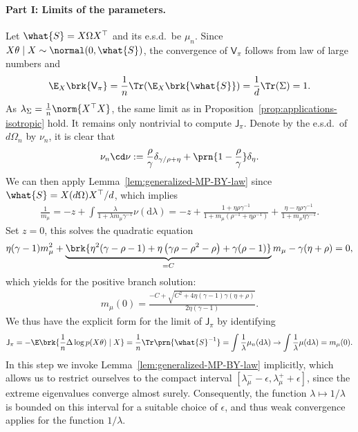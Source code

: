\documentclass[11pt]{article}
\newcommand{\de}{\mathrm{d}}
\newcommand{\jfunc}{\mathsf{J}}
\begin{document}
\paragraph{Part I: Limits of the parameters.} Let $\what{S}=X \Omega X^\top$ and its e.s.d.\ be $\mu_n$. Since $X\theta\mid X \sim \normal(0, \what{S})$, the convergence of $\mathsf{V}_{\pi}$ follows from law of large numbers and
\begin{align*}
    \E_X \brk{\mathsf{V}_{\pi}} = \frac{1}{n} \Tr(\E_{X}\brk{\what{S}}) = \frac{1}{d} \Tr(\Sigma) = 1.
\end{align*}
As $\lambda_\Sigma = \frac{1}{n} \norm{X^\top X}$, the same limit as in Proposition~\ref{prop:applications-isotropic} hold. It remains only nontrivial to compute $\jfunc_{\pi}$. Denote by the e.s.d.\ of $d\Omega_n$ by $\nu_n$, it is clear that
\begin{align*}
    \nu_n \cd \nu := \frac{\rho}{\gamma} \delta_{\gamma/\rho + \eta} + \prn{1 - \frac{\rho}{\gamma}} \delta_{\eta}.
\end{align*}
We can then apply Lemma~\ref{lem:generalized-MP-BY-law} since $\what{S} = X(d\Omega) X^\top / d$, which implies
\begin{align*}
    \frac{1}{m_\mu} = -z + \int \frac{\lambda}{1 + \lambda m_\mu \gamma^{-1}} \nu(\de \lambda) = -z + \frac{1 + \eta \rho \gamma^{-1}}{1 +  m_\mu (\rho^{-1} + \eta \rho^{-1})} + \frac{\eta - \eta \rho \gamma^{-1}}{1 + m_\mu \eta \gamma^{-1}}.
\end{align*}
Set $z=0$, this solves the quadratic equation
\begin{align*}
    \eta(\gamma-1) m_\mu^2+\underbrace{\brk{\eta^2(\gamma-\rho-1)+\eta\left(\gamma \rho-\rho^2-\rho\right)+\gamma(\rho-1)}}_{=C} m_\mu-\gamma(\eta+\rho) = 0,
\end{align*}
which yields for the positive branch solution:
\begin{align*}
    m_\mu(0)=\frac{-C+\sqrt{C^2+4 \eta(\gamma-1) \gamma(\eta+\rho)}}{2 \eta(\gamma-1)}.
\end{align*}
We thus have the explicit form for the limit of $\jfunc_\pi$ by identifying
\begin{align*}
    \jfunc_\pi= -\E \brk{\frac{1}{n} \Delta \log p(X\theta) \mid X} = \frac{1}{n} \Tr \prn{\what{S}^{-1}} = \int \frac{1}{\lambda} \mu_n(\de \lambda) \to\int \frac{1}{\lambda} \mu(\de \lambda) = m_{\mu}(0).
\end{align*}
In this step we invoke Lemma~\ref{lem:generalized-MP-BY-law} implicitly, which allows us to restrict ourselves to the compact interval $[\lambda_\mu^{-}-\epsilon, \lambda_\mu^+ + \epsilon]$, since the extreme eigenvalues converge almost surely. Consequently, the function $\lambda \mapsto 1/\lambda$ is bounded on this interval for a suitable choice of $\epsilon$, and thus weak convergence applies for the function $1/\lambda$.
\end{document}
